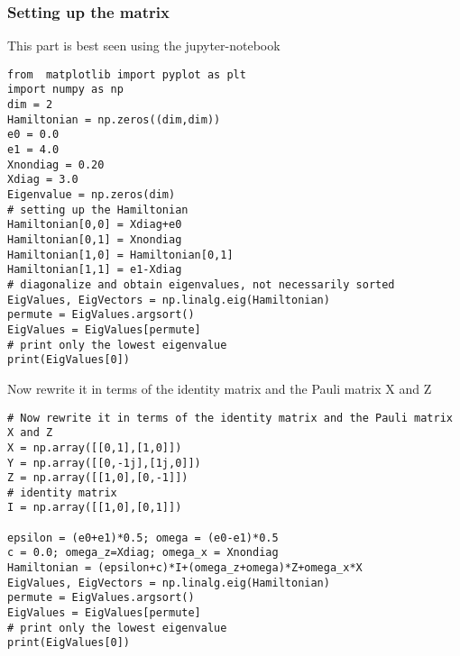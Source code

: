 \documentclass{beamer}
\begin{document}
\begin{frame}
\frametitle{Setting up the matrix}

This part is best seen using the jupyter-notebook






















\begin{verbatim}
from  matplotlib import pyplot as plt
import numpy as np
dim = 2
Hamiltonian = np.zeros((dim,dim))
e0 = 0.0
e1 = 4.0
Xnondiag = 0.20
Xdiag = 3.0
Eigenvalue = np.zeros(dim)
# setting up the Hamiltonian
Hamiltonian[0,0] = Xdiag+e0
Hamiltonian[0,1] = Xnondiag
Hamiltonian[1,0] = Hamiltonian[0,1]
Hamiltonian[1,1] = e1-Xdiag
# diagonalize and obtain eigenvalues, not necessarily sorted
EigValues, EigVectors = np.linalg.eig(Hamiltonian)
permute = EigValues.argsort()
EigValues = EigValues[permute]
# print only the lowest eigenvalue
print(EigValues[0])

\end{verbatim}


Now rewrite it in terms of the identity matrix and the Pauli matrix X and Z

















\begin{verbatim}
# Now rewrite it in terms of the identity matrix and the Pauli matrix X and Z
X = np.array([[0,1],[1,0]])
Y = np.array([[0,-1j],[1j,0]])
Z = np.array([[1,0],[0,-1]])
# identity matrix
I = np.array([[1,0],[0,1]])

epsilon = (e0+e1)*0.5; omega = (e0-e1)*0.5
c = 0.0; omega_z=Xdiag; omega_x = Xnondiag
Hamiltonian = (epsilon+c)*I+(omega_z+omega)*Z+omega_x*X
EigValues, EigVectors = np.linalg.eig(Hamiltonian)
permute = EigValues.argsort()
EigValues = EigValues[permute]
# print only the lowest eigenvalue
print(EigValues[0])

\end{verbatim}
\end{frame}
\end{document}
